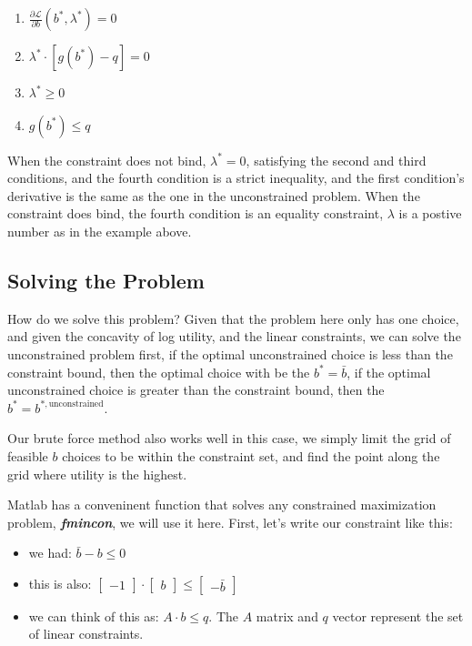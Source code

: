 \documentclass[
]{book}
\begin{document}
\begin{enumerate}
\def\labelenumi{\arabic{enumi}.}
\item
  \(\displaystyle \frac{\partial \mathcal{L}}{\partial b}(b^* ,\lambda^* )=0\)
\item
  \(\displaystyle \lambda^* \cdot [g(b^* )-q]=0\)
\item
  \(\displaystyle \lambda^* \ge 0\)
\item
  \(\displaystyle g(b^* )\le q\)
\end{enumerate}

When the constraint does not bind, \(\lambda^* =0\), satisfying the second
and third conditions, and the fourth condition is a strict inequality,
and the first condition's derivative is the same as the one in the
unconstrained problem. When the constraint does bind, the fourth
condition is an equality constraint, \(\lambda\) is a postive number as in
the example above.

\hypertarget{solving-the-problem}{%
\subsection{Solving the Problem}\label{solving-the-problem}}

How do we solve this problem? Given that the problem here only has one
choice, and given the concavity of log utility, and the linear
constraints, we can solve the unconstrained problem first, if the
optimal unconstrained choice is less than the constraint bound, then the
optimal choice with be the \(b^* =\bar{b}\), if the optimal unconstrained
choice is greater than the constraint bound, then the
\(b^* =b^{*,\textrm{unconstrained}}\).

Our brute force method also works well in this case, we simply limit the
grid of feasible \(b\) choices to be within the constraint set, and find
the point along the grid where utility is the highest.

Matlab has a conveninent function that solves any constrained
maximization problem, \textbf{\emph{fmincon}}, we will use it here. First, let's
write our constraint like this:

\begin{itemize}
\item
  we had: \(\bar{b} -b\le 0\)
\item
  this is also: \(\left\lbrack \begin{array}{c} -1 \end{array}\right\rbrack \cdot \left\lbrack \begin{array}{c} b \end{array}\right\rbrack \le \left\lbrack \begin{array}{c} -\bar{b} \end{array}\right\rbrack\)
\item
  we can think of this as: \(A\cdot b\le q\). The \(A\) matrix and \(q\)
  vector represent the set of linear constraints.
\end{itemize}
\end{document}
